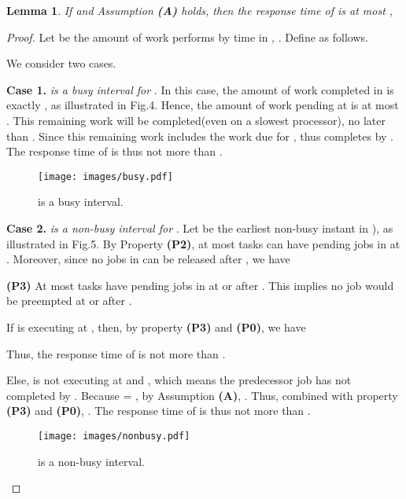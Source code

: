 \documentclass[Times, 10pt,twocolumn]{article}
\newtheorem{lemma}{\textbf{Lemma}}
\theoremstyle{definition}
\begin{document}
\begin{lemma}
\label{lower_bound}
If  and Assumption \textbf{(A)} holds, then the response time of  is at most ,
\end{lemma}
\begin{proof}
Let  be the amount of work  performs by time  in , . Define  as follows.


We consider two cases.

\vspace{1mm}
\textbf{Case 1.} \textit{ is a busy interval for} . In this case, the amount of work completed in  is exactly , as illustrated in Fig.4. Hence, the amount of work pending at  is at most . This remaining work will be completed(even on a slowest processor), no later than . Since this remaining work includes the work due for ,  thus completes by . The response time of  is thus not more than . 

\begin{figure}[t]
	\begin{center}
	\texttt{[image: images/busy.pdf]} 
	\end{center} 
\vspace{-2mm}
\caption{\small  is a busy interval.}
\vspace{-2mm}
\label{fig:busy}
\end{figure}



\vspace{1mm}
\textbf{Case 2.} \textit{ is a non-busy interval for} . Let  be the earliest non-busy instant in ), as illustrated in Fig.5. By Property \textbf{(P2)}, at most  tasks can have pending jobs in  at . Moreover, since no jobs in  can be released after , we have
\vspace{-3mm}
\begin{changemargin}{8mm}{8mm}
\textbf{(P3)} At most  tasks have pending jobs  in  at or after . This implies no job would be preempted at or after .
\end{changemargin}\vspace{-3mm}

\noindent If  is executing at , then, by property \textbf{(P3)} and \textbf{(P0)}, we have




Thus, the response time of  is not more than .

Else,  is not executing at  and , which means the predecessor job  has not completed by . Because  = , by Assumption \textbf{(A)}, . Thus, combined with property \textbf{(P3)} and \textbf{(P0)}, . The response time of  is thus not more than . \qedhere


\begin{figure}[t]
	\begin{center}
	\texttt{[image: images/nonbusy.pdf]} 
	\end{center} 
\vspace{-2mm}
\caption{\small  is a non-busy interval.}
\vspace{-2mm}
\label{fig:nonbusy}
\end{figure}

\end{proof}
\end{document}
